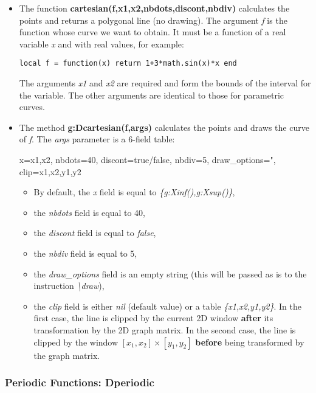 \begin{itemize}
    \item The function \textbf{cartesian(f,x1,x2,nbdots,discont,nbdiv)} calculates the points and returns a polygonal line (no drawing). The argument \emph{f} is the function whose curve we want to obtain. It must be a function of a real variable \emph{x} and with real values, for example:

\texttt{local f = function(x) return 1+3*math.sin(x)*x end}

The arguments \emph{x1} and \emph{x2} are required and form the bounds of the interval for the variable. The other arguments are identical to those for parametric curves.

    \item The method \textbf{g:Dcartesian(f,args)} calculates the points and draws the curve of \emph{f}. The \emph{args} parameter is a 6-field table:

\begin{TeXcode}
{ x={x1,x2}, nbdots=40, discont=true/false, nbdiv=5, draw_options=", clip={x1,x2,y1,y2} }
\end{TeXcode}

\begin{itemize}
    \item By default, the \emph{x} field is equal to \emph{\{g:Xinf(),g:Xsup()\}},
    \item the \emph{nbdots} field is equal to 40,
    \item the \emph{discont} field is equal to \emph{false},
    \item the \emph{nbdiv} field is equal to 5,
    \item the \emph{draw\_options} field is an empty string (this will be passed as is to the instruction \emph{\textbackslash draw}),
    \item the \emph{clip} field is either \emph{nil} (default value) or a table \emph{\{x1,x2,y1,y2\}}. In the first case, the line is clipped by the current 2D window \textbf{after} its transformation by the 2D graph matrix. In the second case, the line is clipped by the window $[x_1,x_2]\times[y_1,y_2]$ \textbf{before} being transformed by the graph matrix.
\end{itemize}
\end{itemize}

\subsubsection{Periodic Functions: Dperiodic}

